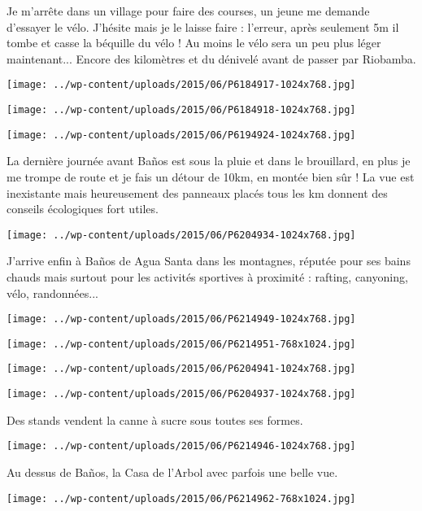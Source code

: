 Je m'arrête dans un village pour faire des courses, un jeune me demande d'essayer le vélo. J'hésite mais je le laisse faire : l'erreur, après seulement 5m il tombe et casse la béquille du vélo ! Au moins le vélo sera un peu plus léger maintenant...
Encore des kilomètres et du dénivelé avant de passer par Riobamba. 
\begin{center} \texttt{[image: ../wp-content/uploads/2015/06/P6184917-1024x768.jpg]} \end{center}
\begin{center} \texttt{[image: ../wp-content/uploads/2015/06/P6184918-1024x768.jpg]} \end{center}
\begin{center} \texttt{[image: ../wp-content/uploads/2015/06/P6194924-1024x768.jpg]} \end{center}
\pagebreak

La dernière journée avant Baños est sous la pluie et dans le brouillard, en plus je me trompe de route et je fais un détour de 10km, en montée bien sûr ! La vue est inexistante mais heureusement des panneaux placés tous les km donnent des conseils écologiques fort utiles. 
\begin{center} \texttt{[image: ../wp-content/uploads/2015/06/P6204934-1024x768.jpg]} \end{center}

J'arrive enfin à Baños de Agua Santa dans les montagnes, réputée pour ses bains chauds mais surtout pour les activités sportives à proximité : rafting, canyoning, vélo, randonnées... 
\begin{center} \texttt{[image: ../wp-content/uploads/2015/06/P6214949-1024x768.jpg]} \end{center}
\begin{center} \texttt{[image: ../wp-content/uploads/2015/06/P6214951-768x1024.jpg]} \end{center}
\begin{center} \texttt{[image: ../wp-content/uploads/2015/06/P6204941-1024x768.jpg]} \end{center}
\begin{center} \texttt{[image: ../wp-content/uploads/2015/06/P6204937-1024x768.jpg]} \end{center}

Des stands vendent la canne à sucre sous toutes ses formes. 
\begin{center} \texttt{[image: ../wp-content/uploads/2015/06/P6214946-1024x768.jpg]} \end{center}
\pagebreak

Au dessus de Baños, la Casa de l'Arbol avec parfois une belle vue. 
\begin{center} \texttt{[image: ../wp-content/uploads/2015/06/P6214962-768x1024.jpg]} \end{center}
